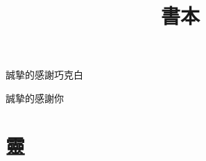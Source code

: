 \documentclass[dvipdfmx]{ujbook}
\author{}
\title{書本}
\begin{document}
\frontmatter
\maketitle
\begin{qte}\Huge
  誠摯的感謝巧克白
\end{qte}
\begin{qte}\Huge
\end{qte}
\begin{qte}\Huge
  誠摯的感謝你
\end{qte}
\tableofcontents

\mainmatter
\part{}
\part{靈}

\appendix

\backmatter
\end{document}
